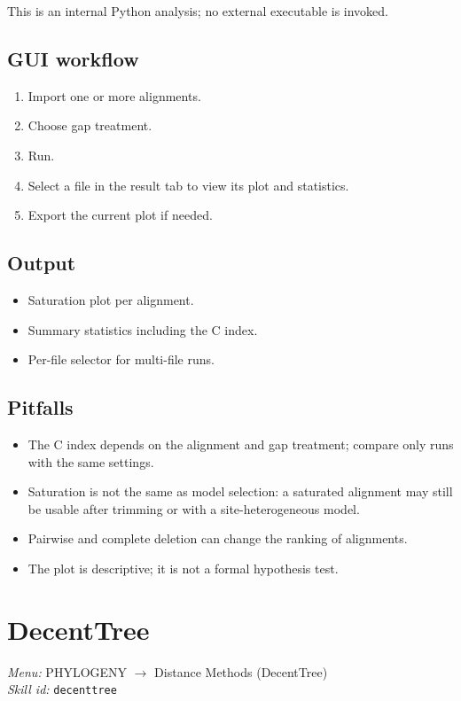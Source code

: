 \documentclass[11pt]{report}
\begin{document}
This is an internal Python analysis; no external executable is invoked.

\subsection{GUI workflow}

\begin{enumerate}
  \item Import one or more alignments.
  \item Choose gap treatment.
  \item Run.
  \item Select a file in the result tab to view its plot and statistics.
  \item Export the current plot if needed.
\end{enumerate}

\subsection{Output}

\begin{itemize}
  \item Saturation plot per alignment.
  \item Summary statistics including the C index.
  \item Per-file selector for multi-file runs.
\end{itemize}

\subsection{Pitfalls}

\begin{itemize}
  \item The C index depends on the alignment and gap treatment; compare only runs with the same settings.
  \item Saturation is not the same as model selection: a saturated alignment may still be usable after trimming or with a site-heterogeneous model.
  \item Pairwise and complete deletion can change the ranking of alignments.
  \item The plot is descriptive; it is not a formal hypothesis test.
\end{itemize}


\section{DecentTree}
\noindent\textit{Menu:} PHYLOGENY $\rightarrow$ Distance Methods (DecentTree)\\
\noindent\textit{Skill id:} \texttt{decenttree}
\end{document}
